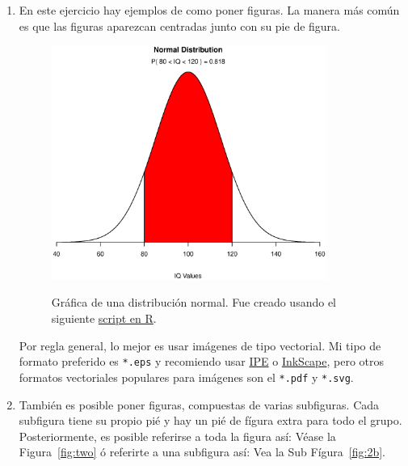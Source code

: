 \begin{enumerate}
 \item En este ejercicio hay ejemplos de como poner figuras.
La manera más común es que las figuras aparezcan centradas junto con su pie de figura.
 
\begin{figure}[htb]
  \centering
  \includegraphics[width=0.85\textwidth]{img/normal}
  \label{fig:one}
\caption[Distribución normal]{Gráfica de una distribución normal. Fue creado usando el siguiente \href{https://www.statmethods.net/advgraphs/probability.html}{script en R}.}
\end{figure}

Por regla general, lo mejor es usar imágenes de tipo vectorial.
Mi tipo de formato preferido es \verb|*.eps| y recomiendo usar \href{https://ipe.otfried.org/}{IPE} o \href{https://inkscape.org/}{InkScape}, pero otros formatos vectoriales populares para imágenes son el \verb|*.pdf| y \verb|*.svg|.

\item También es posible poner figuras, compuestas de varias subfiguras.
Cada subfigura tiene su propio pié y hay un pié de fígura extra para todo el grupo.
Posteriormente, es posible referirse a toda la figura así: Véase la  Figura~\ref{fig:two} ó referirte a una subfigura así:
Vea la Sub Fígura~\ref{fig:2b}.


\end{enumerate}
